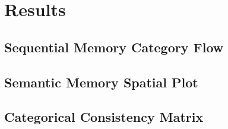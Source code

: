 \section{Results}

\subsection{Sequential Memory Category Flow}

\subsection{Semantic Memory Spatial Plot}

\subsection{Categorical Consistency Matrix}
